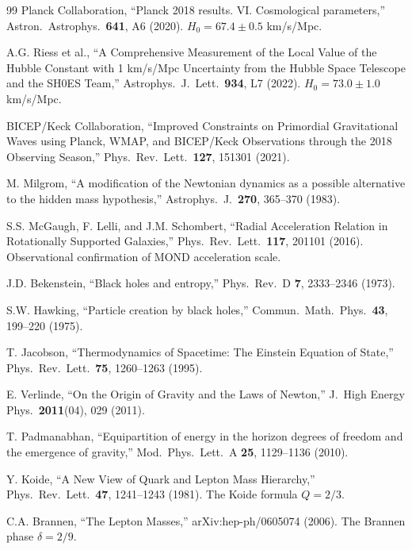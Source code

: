 \documentclass[11pt,a4paper]{article}
\theoremstyle{plain}
\theoremstyle{definition}
\theoremstyle{remark}
\begin{document}
\begin{thebibliography}{99}
 Planck Collaboration, ``Planck 2018 results. VI. Cosmological parameters,'' Astron.\ Astrophys.\ \textbf{641}, A6 (2020). $H_0 = 67.4 \pm 0.5$ km/s/Mpc.

 A.G. Riess et al., ``A Comprehensive Measurement of the Local Value of the Hubble Constant with 1 km/s/Mpc Uncertainty from the Hubble Space Telescope and the SH0ES Team,'' Astrophys.\ J.\ Lett.\ \textbf{934}, L7 (2022). $H_0 = 73.0 \pm 1.0$ km/s/Mpc.

 BICEP/Keck Collaboration, ``Improved Constraints on Primordial Gravitational Waves using Planck, WMAP, and BICEP/Keck Observations through the 2018 Observing Season,'' Phys.\ Rev.\ Lett.\ \textbf{127}, 151301 (2021).

 M. Milgrom, ``A modification of the Newtonian dynamics as a possible alternative to the hidden mass hypothesis,'' Astrophys.\ J.\ \textbf{270}, 365--370 (1983).

 S.S. McGaugh, F. Lelli, and J.M. Schombert, ``Radial Acceleration Relation in Rotationally Supported Galaxies,'' Phys.\ Rev.\ Lett.\ \textbf{117}, 201101 (2016). Observational confirmation of MOND acceleration scale.

 J.D. Bekenstein, ``Black holes and entropy,'' Phys.\ Rev.\ D \textbf{7}, 2333--2346 (1973).

 S.W. Hawking, ``Particle creation by black holes,'' Commun.\ Math.\ Phys.\ \textbf{43}, 199--220 (1975).

 T. Jacobson, ``Thermodynamics of Spacetime: The Einstein Equation of State,'' Phys.\ Rev.\ Lett.\ \textbf{75}, 1260--1263 (1995).

 E. Verlinde, ``On the Origin of Gravity and the Laws of Newton,'' J.\ High Energy Phys.\ \textbf{2011}(04), 029 (2011).

 T. Padmanabhan, ``Equipartition of energy in the horizon degrees of freedom and the emergence of gravity,'' Mod.\ Phys.\ Lett.\ A \textbf{25}, 1129--1136 (2010).

 Y. Koide, ``A New View of Quark and Lepton Mass Hierarchy,'' Phys.\ Rev.\ Lett.\ \textbf{47}, 1241--1243 (1981). The Koide formula $Q = 2/3$.

 C.A. Brannen, ``The Lepton Masses,'' arXiv:hep-ph/0605074 (2006). The Brannen phase $\delta = 2/9$.


\end{thebibliography}
\end{document}
